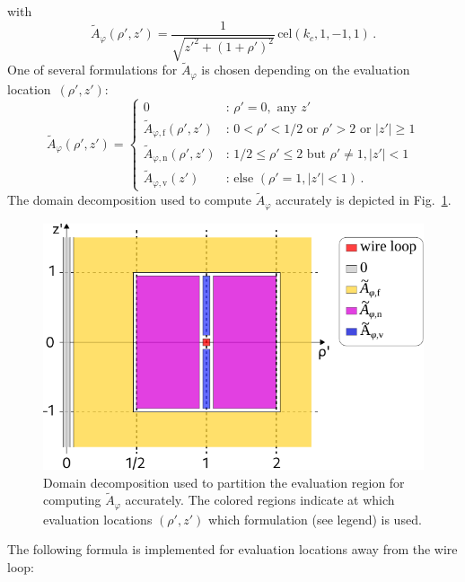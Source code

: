 with
\begin{equation}
  \tilde{A}_\varphi(\rho',z')
  = \frac{1}{\sqrt{z'^2 + (1 + \rho')^2}} \,\mathrm{cel}(k_c, 1, -1, 1) \, .
\end{equation}
One of several formulations for $\tilde{A}_\varphi$ is chosen depending on the evaluation location~$(\rho', z')$:
\begin{equation}
  \tilde{A}_\varphi (\rho', z') =
  \begin{cases}
    0                                          &:\, \rho' = 0 , \textrm{ any } z' \\
    \tilde{A}_{\varphi,\mathrm{f}} (\rho', z') &:\, 0 < \rho' < 1/2 \textrm{ or } \rho' > 2 \textrm{ or } |z'| \geq 1 \\
    \tilde{A}_{\varphi,\mathrm{n}} (\rho', z') &:\, 1/2 \leq \rho' \leq 2 \textrm{ but } \rho' \neq 1, |z'| < 1 \\
    \tilde{A}_{\varphi,\mathrm{v}} (z')        &:\, \textrm{else } (\rho' = 1, |z'| < 1) \, .
  \end{cases} \label{eqn:A_phi_final}
\end{equation}
The domain decomposition used to compute $\tilde{A}_\varphi$ accurately is depicted in Fig.~\ref{fig:cwl_A_phi_regions}.
\begin{figure}[htbp]
    \centering
    \includegraphics{img/cwl_A_phi_regions.pdf}
    \caption{Domain decomposition used to partition the evaluation region
             for computing $\tilde{A}_\varphi$ accurately.
             The colored regions indicate at which evaluation locations $(\rho',z')$
             which formulation (see legend) is used.}
    \label{fig:cwl_A_phi_regions}
\end{figure}
The following formula is implemented for evaluation locations away from the wire loop:
